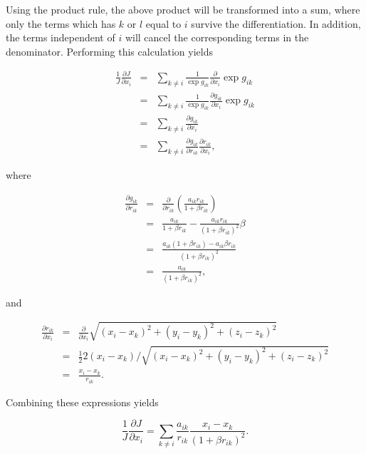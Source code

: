 Using the product rule, the above product will be transformed into a sum, where only the terms which has $k$ or $l$ equal to $i$ survive the differentiation. In addition, the terms independent of $i$ will cancel the corresponding terms in the denominator. Performing this calculation yields

\begin{eqnarray}
  \frac{1}{J}\frac{\partial J}{\partial x_i} &=& \sum_{k \ne i} \frac{1}{\exp g_{ik}}\frac{\partial}{\partial x_i} \exp g_{ik} \nonumber\\
  &=& \sum_{k \ne i} \frac{1}{\exp g_{ik}}\frac{\partial g_{ik}}{\partial x_i} \exp g_{ik}\nonumber \\
  &=& \sum_{k \ne i} \frac{\partial g_{ik}}{\partial x_i} \nonumber \\
  &=& \sum_{k \ne i} \frac{\partial g_{ik}}{\partial r_{ik}}\frac{\partial r_{ik}}{\partial x_i},
\end{eqnarray}

where

\begin{eqnarray}
 \frac{\partial g_{ik}}{\partial r_{ik}} &=& \frac{\partial }{\partial r_{ik}} \left(\frac{a_{ik}r_{ik}}{1 + \beta r_{ik}}\right) \nonumber\\
  &=& \frac{a_{ik}}{1 + \beta r_{ik}} - \frac{a_{ik}r_{ik}}{(1 + \beta r_{ik})^2}\beta \nonumber \\
  &=& \frac{a_{ik}(1 + \beta r_{ik}) - a_{ik}\beta r_{ik}}{(1 + \beta r_{ik})^2}  \nonumber \\
  &=& \frac{a_{ik}}{(1 + \beta r_{ik})^2}, \label{eq:jastrowDgikDrik}
\end{eqnarray}

and

\begin{eqnarray}
 \frac{\partial r_{ik}}{\partial x_i} &=& \frac{\partial }{\partial x_i} \sqrt{(x_i - x_k)^2 + (y_i - y_k)^2 + (z_i - z_k)^2} \nonumber \\
  &=& \frac{1}{2} 2(x_i - x_k) / \sqrt{(x_i - x_k)^2 + (y_i - y_k)^2 + (z_i - z_k)^2} \nonumber \\
  &=& \frac{x_i - x_k}{r_{ik}}.
\end{eqnarray}

Combining these expressions yields

\begin{equation}
\label{eq:jastrowDerivX}
 \frac{1}{J}\frac{\partial J}{\partial x_i} = \sum_{k \ne i} \frac{a_{ik}}{r_{ik}}\frac{x_i - x_k}{(1 + \beta r_{ik})^2}.
\end{equation}


